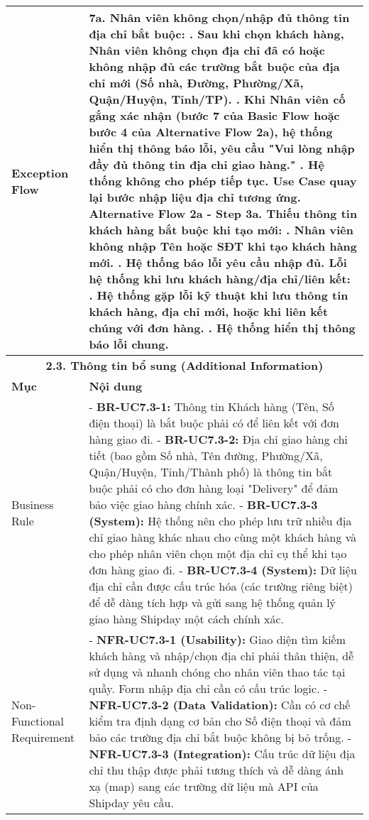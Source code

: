 \begin{longtable}{|m{4cm}|p{11cm}|}
\hline
Exception Flow & \textbf{7a. Nhân viên không chọn/nhập đủ thông tin địa chỉ bắt buộc:} \newline    1. Sau khi chọn khách hàng, Nhân viên không chọn địa chỉ đã có hoặc không nhập đủ các trường bắt buộc của địa chỉ mới (Số nhà, Đường, Phường/Xã, Quận/Huyện, Tỉnh/TP). \newline    2. Khi Nhân viên cố gắng xác nhận (bước 7 của Basic Flow hoặc bước 4 của Alternative Flow 2a), hệ thống hiển thị thông báo lỗi, yêu cầu "Vui lòng nhập đầy đủ thông tin địa chỉ giao hàng." \newline    3. Hệ thống không cho phép tiếp tục. Use Case quay lại bước nhập liệu địa chỉ tương ứng. \newline \textbf{Alternative Flow 2a - Step 3a. Thiếu thông tin khách hàng bắt buộc khi tạo mới:} \newline    1. Nhân viên không nhập Tên hoặc SĐT khi tạo khách hàng mới. \newline    2. Hệ thống báo lỗi yêu cầu nhập đủ. \newline \textbf{Lỗi hệ thống khi lưu khách hàng/địa chỉ/liên kết:} \newline    1. Hệ thống gặp lỗi kỹ thuật khi lưu thông tin khách hàng, địa chỉ mới, hoặc khi liên kết chúng với đơn hàng. \newline    2. Hệ thống hiển thị thông báo lỗi chung. \\
\hline
\multicolumn{2}{|c|}{\textbf{2.3. Thông tin bổ sung (Additional Information)}} \\
\hline
\textbf{Mục} & \textbf{Nội dung} \\
\hline
Business Rule & - \textbf{BR-UC7.3-1:} Thông tin Khách hàng (Tên, Số điện thoại) là bắt buộc phải có để liên kết với đơn hàng giao đi. \newline - \textbf{BR-UC7.3-2:} Địa chỉ giao hàng chi tiết (bao gồm Số nhà, Tên đường, Phường/Xã, Quận/Huyện, Tỉnh/Thành phố) là thông tin bắt buộc phải có cho đơn hàng loại "Delivery" để đảm bảo việc giao hàng chính xác. \newline - \textbf{BR-UC7.3-3 (System):} Hệ thống nên cho phép lưu trữ nhiều địa chỉ giao hàng khác nhau cho cùng một khách hàng và cho phép nhân viên chọn một địa chỉ cụ thể khi tạo đơn hàng giao đi. \newline - \textbf{BR-UC7.3-4 (System):} Dữ liệu địa chỉ cần được cấu trúc hóa (các trường riêng biệt) để dễ dàng tích hợp và gửi sang hệ thống quản lý giao hàng Shipday một cách chính xác. \\
\hline
Non-Functional Requirement & - \textbf{NFR-UC7.3-1 (Usability):} Giao diện tìm kiếm khách hàng và nhập/chọn địa chỉ phải thân thiện, dễ sử dụng và nhanh chóng cho nhân viên thao tác tại quầy. Form nhập địa chỉ cần có cấu trúc logic. \newline - \textbf{NFR-UC7.3-2 (Data Validation):} Cần có cơ chế kiểm tra định dạng cơ bản cho Số điện thoại và đảm bảo các trường địa chỉ bắt buộc không bị bỏ trống. \newline - \textbf{NFR-UC7.3-3 (Integration):} Cấu trúc dữ liệu địa chỉ thu thập được phải tương thích và dễ dàng ánh xạ (map) sang các trường dữ liệu mà API của Shipday yêu cầu. \\

\end{longtable}
